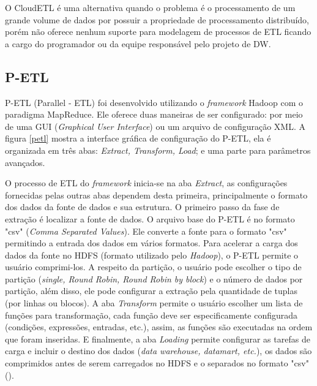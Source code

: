 O CloudETL é uma alternativa quando o problema é o processamento de um grande volume de dados por possuir a propriedade de processamento distribuído, porém não oferece nenhum suporte para modelagem de processos de ETL ficando a cargo do programador ou da equipe responsável pelo projeto de DW. 


\subsection{P-ETL}

P-ETL (Parallel - ETL) foi desenvolvido utilizando o \textit{framework} Hadoop com o paradigma MapReduce. Ele oferece duas maneiras de ser configurado: por meio de uma GUI (\textit{Graphical User Interface}) ou um arquivo de configuração XML. A figura \ref{petl} mostra a interface gráfica de configuração do P-ETL, ela é organizada em três abas: \textit{Extract, Transform, Load}; e uma parte para parâmetros avançados. 

O processo de ETL do \textit{framework} inicia-se na aba \textit{Extract}, as configurações fornecidas pelas outras abas dependem desta primeira, principalmente o formato dos dados da fonte de dados e sua estrutura. O primeiro passo da fase de extração é localizar a fonte de dados.  O arquivo base do P-ETL é no formato "csv" (\textit{Comma Separated Values}). Ele converte a fonte para o formato "csv" permitindo a entrada dos dados em vários formatos. Para acelerar a carga dos dados da fonte no HDFS (formato utilizado pelo \textit{Hadoop}), o P-ETL permite o usuário comprimi-los. A respeito da partição, o usuário pode escolher o tipo de partição (\textit{single, Round Robin, Round Robin by block}) e o número de dados por partição, além disso, ele pode configurar a extração pela quantidade de tuplas (por linhas ou blocos). A aba \textit{Transform} permite o usuário escolher um lista de funções para transformação, cada função deve ser especificamente configurada (condições, expressões, entradas, etc.), assim, as funções são executadas na ordem que foram inseridas. E finalmente, a aba \textit{Loading} permite configurar as tarefas de carga e incluir o destino dos dados (\textit{data warehouse, datamart, etc.}), os dados são comprimidos antes de serem carregados no HDFS e o separados no formato "csv" (\cite{bala:2014}).


